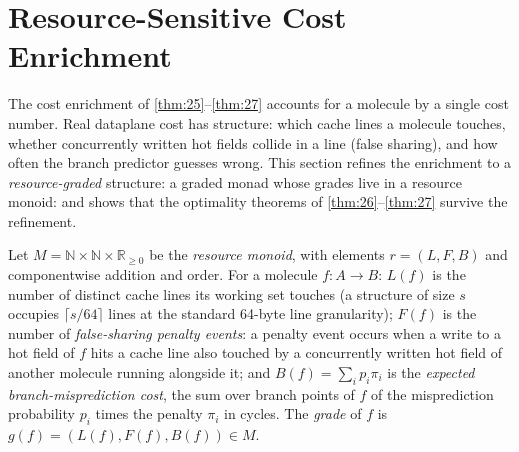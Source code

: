 \section{Resource-Sensitive Cost Enrichment}\label{sec:enrich-graded}

The cost enrichment of \autoref{thm:25}--\autoref{thm:27} accounts for a
molecule by a single cost number. Real dataplane cost has structure:
which cache lines a molecule touches, whether concurrently written hot
fields collide in a line (false sharing), and how often the branch
predictor guesses wrong. This section refines the enrichment to a
\emph{resource-graded} structure: a graded monad whose grades live in
a resource monoid: and shows that the optimality theorems of
\ref{thm:26}--\ref{thm:27} survive the refinement.

\begin{definition}\label{def:grades}
Let $M = \mathbb{N} \times \mathbb{N} \times \mathbb{R}_{\ge 0}$ be the
\emph{resource monoid}, with elements $r = (L, F, B)$ and componentwise
addition and order. For a molecule $f \colon A \to B$: $L (f)$ is the
number of distinct cache lines its working set touches (a structure of
size $s$ occupies $\lceil s/64 \rceil$ lines at the standard 64-byte
line granularity); $F (f)$ is the number of \emph{false-sharing penalty
events}: a penalty event occurs when a write to a hot field of $f$
hits a cache line also touched by a concurrently written hot field of
another molecule running alongside it; and $B (f) = \sum_i p_i \pi_i$ is
the \emph{expected branch-misprediction cost}, the sum over branch
points of $f$ of the misprediction probability $p_i$ times the penalty
$\pi_i$ in cycles. The \emph{grade} of $f$ is $g (f) = (L (f), F (f),
B (f)) \in M$.
\end{definition}

